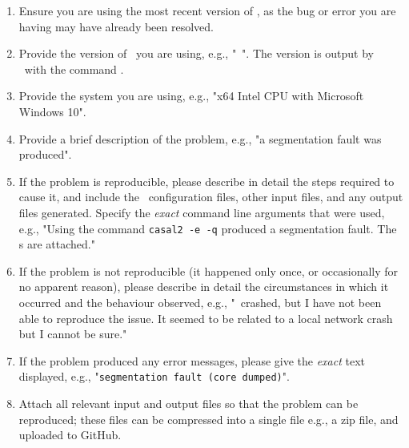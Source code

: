 \begin{enumerate}
\item Ensure you are using the most recent version of \CNAME, as the bug or error you are having may have already been resolved. 
\item Provide the version of \CNAME\ you are using, e.g., "\CNAME\ \VER". The version is output by \CNAME\ with the command .
\item Provide the system  you are using, e.g., "x64 Intel CPU with Microsoft Windows 10".
\item Provide a brief description of the problem, e.g., "a segmentation fault was produced".
\item If the problem is reproducible, please describe in detail the steps required to cause it, and include the \CNAME\ configuration files, other input files, and any output files generated. Specify the \emph{exact} command line arguments that were used, e.g., "Using the command \texttt{casal2 -e -q} produced a segmentation fault. The \config s are attached."
\item If the problem is not reproducible (it happened only once, or occasionally for no apparent reason), please describe in detail the circumstances in which it occurred and the behaviour observed, e.g., "\CNAME\ crashed, but I have not been able to reproduce the issue. It seemed to be related to a local network crash but I cannot be sure."
\item If the problem produced any error messages, please give the \emph{exact} text displayed, e.g., "\texttt{segmentation fault (core dumped)}".
\item Attach all relevant input and output files so that the problem can be reproduced; these files can be compressed into a single file e.g., a zip file, and uploaded to GitHub.
\end{enumerate}

